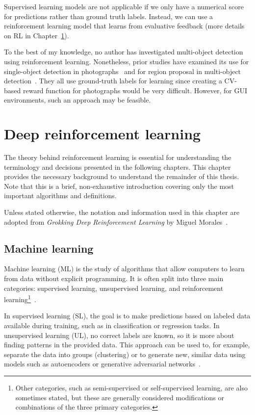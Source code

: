 \documentclass[
  digital,     %
  oneside,     %
  nosansbold,  %
  nocolorbold, %
  lof,         %
  lot,         %
]{fithesis4}
\begin{document}
Supervised learning models are not applicable if we only have a numerical score for predictions rather than ground truth labels. Instead, we can use a reinforcement learning model that learns from evaluative feedback (more details on RL in Chapter~\ref{ch:dlr}).

To the best of my knowledge, no author has investigated multi-object detection using reinforcement learning. Nonetheless, prior studies have examined its use for single-object detection in photographs~\cite{iterative_od_with_rl, hierarchical_od_with_drl} and for region proposal in multi-object detection~\cite{drl_rpn}. They all use ground-truth labels for learning since creating a CV-based reward function for photographs would be very difficult. However, for GUI environments, such an approach may be feasible.

\chapter{Deep reinforcement learning}
\label{ch:dlr}

The theory behind reinforcement learning is essential for understanding the terminology and decisions presented in the following chapters. This chapter provides the necessary background to understand the remainder of this thesis. Note that this is a brief, non-exhaustive introduction covering only the most important algorithms and definitions.

Unless stated otherwise, the notation and information used in this chapter are adopted from \textit{Grokking Deep Reinforcement Learning} by Miguel Morales~\cite{GDRL}.

\section{Machine learning}
Machine learning (ML) is the study of algorithms that allow computers to learn from data without explicit programming. It is often split into three main categories: supervised learning, unsupervised learning, and reinforcement learning\footnote{Other categories, such as semi-supervised or self-supervised learning, are also sometimes stated, but these are generally considered modifications or combinations of the three primary categories.}~\cite{IB031}.

In supervised learning (SL), the goal is to make predictions based on labeled data available during training, such as in classification or regression tasks. In unsupervised learning (UL), no correct labels are known, so it is more about finding patterns in the provided data. This approach can be used to, for example, separate the data into groups (clustering) or to generate new, similar data using models such as autoencoders or generative adversarial networks~\cite{IB031, PV021}.
\end{document}
